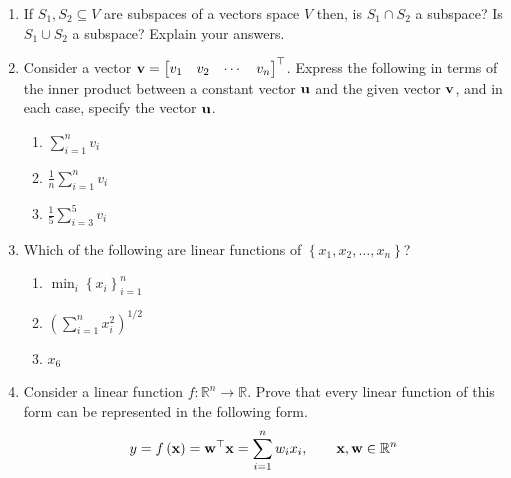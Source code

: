 \begin{enumerate}

    \item If $S_1, S_2 \subseteq V$ are subspaces of a vectors space $V$ then, is $S_1 \cap S_2$ a subspace? Is $S_1 \cup S_2$ a subspace? Explain your answers.
    
    \item Consider a vector $\mf{v} = \begin{bmatrix*}v_1 & v_2 & \cdots & v_n\end{bmatrix*}^\top$. Express the following in terms of the inner product between a constant vector $\mathbf{u}$ and the given vector $\mathbf{v}$, and in each case, specify the vector $\mathbf{u}$.
    \begin{enumerate}
        \item $\sum_{i=1}^n v_i$
        \item $\frac{1}{n}\sum_{i=1}^n v_i$
        \item $\frac{1}{5}\sum_{i=3}^5 v_i$
    \end{enumerate} 
    
    \item Which of the following are linear functions of $\left\{x_1, x_2, \ldots,x_n\right\}$?
    \begin{enumerate}
        \item $\min_i \left\{x_i\right\}_{i=1}^{n}$
        \item $\left(\sum_{i=1}^n x_i^2\right)^{1/2}$
        \item $x_6$
    \end{enumerate}

    \item Consider a linear function $f: \mathbb{R}^n \rightarrow \mathbb{R}$. Prove that every linear function of this form can be represented in the following form.
    \[ y = f\left(\mathbf{x}\right) = \mathbf{w}^\top\mathbf{x} = \sum_{i=1}^{n}w_ix_i, \quad \quad \mathbf{x}, \mathbf{w} \in \mathbb{R}^n \]


\end{enumerate}
